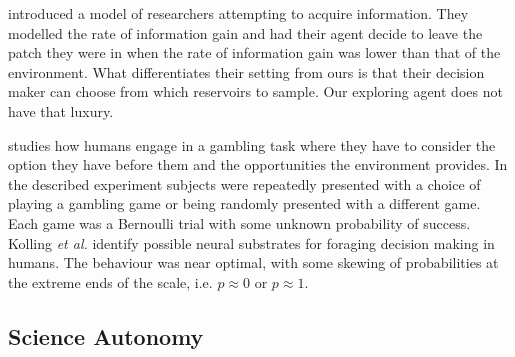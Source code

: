  


\cite{pirolli1999information} introduced a model of researchers attempting to
acquire information.  They modelled the rate of information gain and had their
agent decide to leave the patch they were in when the rate of information gain
was lower than that of the environment.  What differentiates their setting from
ours is that their decision maker can choose from which reservoirs to sample.  Our exploring agent does not have that luxury.


\cite{kolling2012neural} studies how humans engage in a gambling task where
they have to consider the option they have before them and the opportunities
the environment provides.  In the described experiment subjects were repeatedly
presented with a choice of playing a gambling game or being randomly presented
with a different game.  Each game was a Bernoulli trial with some unknown
probability of success.  Kolling \emph{et al.} identify possible neural
substrates for foraging decision making in humans.  The behaviour was near
optimal, with some skewing of probabilities at the extreme ends of the scale,
i.e. $p \approx 0$ or $p \approx 1$.


\subsection{Science Autonomy}

